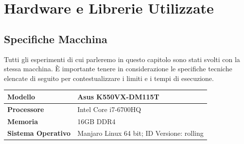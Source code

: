 \documentclass[a4paper,12pt]{report}
\begin{document}
\section{Hardware e Librerie Utilizzate}
\subsection*{Specifiche Macchina}
Tutti gli esperimenti di cui parleremo in questo capitolo sono stati svolti con la stessa macchina. \`E importante tenere in considerazione le specifiche tecniche elencate di seguito per contestualizzare i limiti e i tempi di esecuzione. 
\smallskip

\begin{center}
    \begin{tabular}{|l|l|}
        \hline 
        \textbf{Modello} & Asus K550VX-DM115T \\
        \hline
        \textbf{Processore} & Intel Core i7-6700HQ \\
        \hline
        \textbf{Memoria} & 16GB DDR4 \\
        \hline
        \textbf{Sistema Operativo} & Manjaro Linux 64 bit; ID Versione: rolling \\
        \hline
    \end{tabular}
\end{center}
\end{document}
